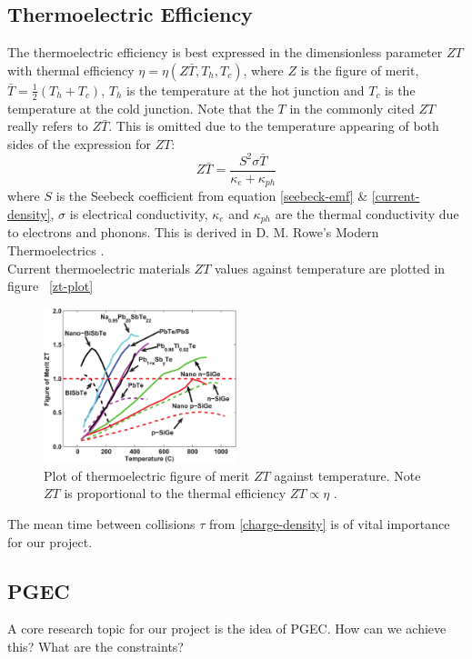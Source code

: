 \documentclass[a4paper,10pt,journal]{IEEEtran}
\newcommand{\figref}[2][\figurename~]{#1\ref{#2}}
\begin{document}
\subsection{Thermoelectric Efficiency}
The thermoelectric efficiency is best expressed in the dimensionless
parameter $ZT$ with thermal efficiency $\eta = \eta (Z\bar{T}, T_h,
T_c)$, where $Z$ is the figure of merit, $\bar{T} = \frac{1}{2}(T_h +
T_c)$, $T_h$ is the temperature at the hot junction and $T_c$ is the
temperature at the cold junction. Note that the $T$ in the commonly
cited $ZT$ really refers to $Z \bar{T}$. This is omitted due to the
temperature appearing of both sides of the expression for $ZT$:
\begin{equation}
\label{zt}
	Z \bar{T} = \frac{S^2 \sigma \bar{T}}{\kappa_e + \kappa_{ph}}
\end{equation}
where $S$ is the Seebeck coefficient from equation \eqref{seebeck-emf}
\& \eqref{current-density}, $\sigma$ is electrical conductivity,
$\kappa_e$ and $\kappa_{ph}$ are the thermal conductivity due to
electrons and phonons. This is derived in D. M. Rowe's Modern
Thermoelectrics \cite{modern-thermoelectrics}.\\
Current thermoelectric materials $ZT$ values against temperature are
plotted in figure \figref{zt-plot}

\begin{figure}
	\centering
	\includegraphics[width=0.5\textwidth]{zt-temp-plot.png}
	\caption{Plot of thermoelectric figure of merit $ZT$ against
	temperature. Note $ZT$ is proportional to the thermal efficiency
	$ZT \propto \eta$ \cite{minnich-review}.}
\end{figure}

The mean time between collisions $\tau$ from \eqref{charge-density} is
of vital importance for our project.

\subsection{\acf{PGEC}}
A core research topic for our project is the idea of \ac{PGEC}. How can
we achieve this? What are the constraints?
\end{document}
